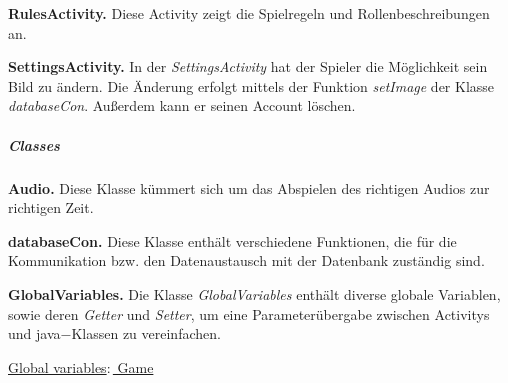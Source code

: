 \documentclass[12pt]{article}
\begin{document}
\vspace{0,3 cm}
      
\textbf{RulesActivity.}
Diese Activity zeigt die Spielregeln und Rollenbeschreibungen an.

\vspace{0,3 cm}
      
\textbf{SettingsActivity.}
In der \textit{SettingsActivity} hat der Spieler die Möglichkeit sein Bild zu ändern. Die Änderung erfolgt mittels der Funktion \textit{setImage} der Klasse \textit{databaseCon}. Außerdem kann er seinen Account löschen.
  		
		
		\subparagraph{Classes}
		
\textbf{Audio.}
Diese Klasse kümmert sich um das Abspielen des richtigen Audios zur richtigen Zeit.

\vspace{0,3 cm}

\textbf{databaseCon.}
Diese Klasse enthält verschiedene Funktionen, die für die Kommunikation bzw. den Datenaustausch mit der Datenbank zuständig sind.

\vspace{0,3 cm}

\textbf{GlobalVariables.}
Die Klasse \textit{GlobalVariables} enthält diverse globale Variablen, sowie deren \textit{Getter} und \textit{Setter}, um eine Parameterübergabe zwischen Activitys und java$-$Klassen zu vereinfachen.

\vspace{0,2 cm}

\underline{Global variables$:$ Game}
\end{document}
